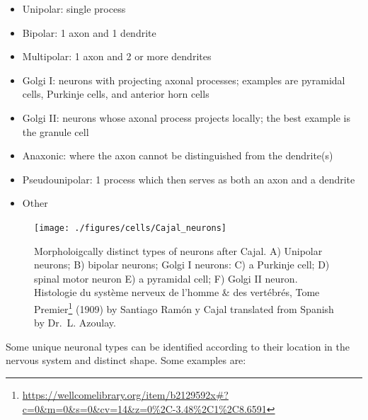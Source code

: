 \documentclass[]{book}
\providecommand{\tightlist}{%
  \setlength{\itemsep}{0pt}\setlength{\parskip}{0pt}}
\let\rmarkdownfootnote\footnote%
\def\footnote{\protect\rmarkdownfootnote}
\renewcommand{\href}[2]{#2\footnote{\url{#1}}}
\begin{document}
\begin{itemize}
\tightlist
\item
  Unipolar: single process
\item
  Bipolar: 1 axon and 1 dendrite
\item
  Multipolar: 1 axon and 2 or more dendrites
\item
  Golgi I: neurons with projecting axonal processes; examples are pyramidal cells, Purkinje cells, and anterior horn cells
\item
  Golgi II: neurons whose axonal process projects locally; the best example is the granule cell
\item
  Anaxonic: where the axon cannot be distinguished from the dendrite(s)
\item
  Pseudounipolar: 1 process which then serves as both an axon and a dendrite
\item
  Other
\end{itemize}



\begin{figure}

{\centering \texttt{[image: ./figures/cells/Cajal\_neurons]} 

}

\caption{Morpholoigcally distinct types of neurons after Cajal. A) Unipolar neurons; B) bipolar neurons; Golgi I neurons: C) a Purkinje cell; D) spinal motor neuron E) a pyramidal cell; F) Golgi II neuron. \href{https://wellcomelibrary.org/item/b2129592x\#?c=0\&m=0\&s=0\&cv=14\&z=0\%2C-3.48\%2C1\%2C8.6591}{Histologie du système nerveux de l'homme \& des vertébrés, Tome Premier} (1909) by Santiago Ramón y Cajal translated from Spanish by Dr.~L. Azoulay.}\label{fig:neurontypes}
\end{figure}

Some unique neuronal types can be identified according to their location in the nervous system and distinct shape. Some examples are:
\end{document}
